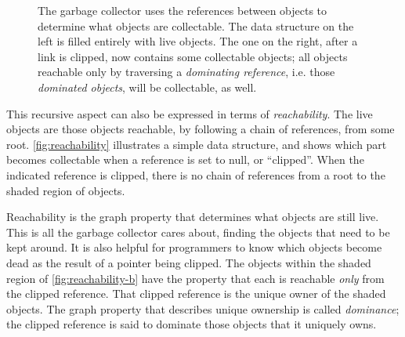 \begin{figure}
\centering
	\hspace{0.18\textwidth}
	\caption{The garbage collector uses the references between objects to
	determine what objects are collectable. The data structure on the left is
	filled entirely with live objects. The one on the right, after a link is
	clipped, now contains some collectable objects; all objects reachable only by
	traversing a \emph{dominating reference}, i.e. those \emph{dominated objects},
	will be collectable, as well.}
	\label{fig:reachability}
\end{figure}

This recursive aspect can also be expressed in terms of \emph{reachability}.
 The live objects are those objects reachable, by following a
chain of references, from some root. \autoref{fig:reachability} illustrates a
simple data structure, and shows which part becomes collectable when a reference
is set to null, or ``clipped''. When the indicated reference is clipped, there is
no chain of references from a root to the shaded region of objects.

Reachability is the graph property that determines what objects are still live.
This is all the garbage collector cares about, finding the objects that need to
be kept around. It is also helpful for programmers to know which objects become
dead as the result of a pointer being clipped. The objects within the shaded
region of \autoref{fig:reachability-b} have the property that each is reachable
\emph{only} from the clipped reference. That clipped reference is the unique
owner of the shaded objects. The graph property that describes unique ownership
is called \emph{dominance};  the clipped reference is said to
dominate those objects that it uniquely owns.

